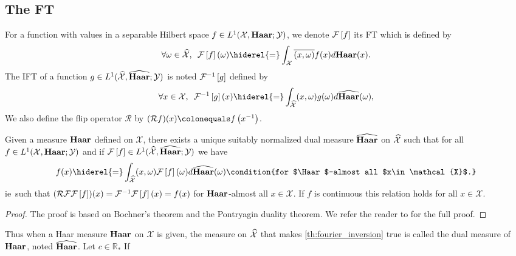\subsection[The Fourier Transform]{The \acl{FT}}
For a function with values in a separable Hilbert space $f\in
L^1(\mathcal{X},\mathbf{Haar};\mathcal{Y})$, we denote $\mathcal{F}\left[f\right]$ its \acf{FT} which is
defined by
\begin{dmath*}
        \forall \omega \in \dual{\mathcal{X}},\enskip \FT{f}(\omega)
        \hiderel{=}\int_{\mathcal{X}} \conj{\pairing{x,\omega}}f(x)d\Haar(x).
\end{dmath*}
The \acf{IFT} of a function $g\in L^1(\widehat{\mathcal{X}},\widehat{\mathbf{Haar}};
\mathcal{Y})$ is noted $\mathcal{F}^{-1}\left[g\right]$ defined by
\begin{dmath*}
    \forall x \in \mathcal{X},\enskip \IFT{g}(x) 
    \hiderel{=}\int_{\dual{\mathcal{X}}} \pairing{x,\omega}g(\omega)
    d\dual{\Haar}(\omega),
\end{dmath*}
We also define the flip operator $\mathcal{R}$ by $(\mathcal{R}f)(x)
\colonequals f\left(\inv{x}\right)$.
\begin{theorem}
    \label{th:fourier_inversion} Given a measure $\Haar$ defined on
    $\mathcal{X}$, there exists a unique suitably normalized dual measure
    $\widehat{\mathbf{Haar}}$ on $\widehat{\mathcal{X}}$ such that for all $f \in
    L^1(\mathcal{X}, \mathbf{Haar};\mathcal{Y})$ and if $\mathcal{F}\left[f\right] \in
    L^1(\widehat{\mathcal{X}}, \widehat{\mathbf{Haar}}; \mathcal{Y})$ we have
    \begin{dmath}
        \label{fourier-l1} f(x) \hiderel{=} \int_{\dual{\mathcal{X}}}
        \pairing{x, \omega} \FT{f}(\omega) d\dual{\Haar}(\omega) \condition{for
        $\Haar$-almost all $x\in \mathcal{X}$.}
    \end{dmath}
    \acs{ie}~such that
    $(\mathcal{R}\mathcal{F}\mathcal{F}\left[f\right])(x)=\mathcal{F}^{-1}\mathcal{F}\left[f\right](x)=f(x)$ for
    $\Haar$-almost all $x\in\mathcal{X}$. If $f$ is continuous this relation
    holds for all $x\in\mathcal{X}$.
\end{theorem}
\begin{proof}
    The proof is based on Bochner's theorem and the Pontryagin duality theorem.
    We refer the reader to \citet[theorem~4.22 page~105 and theorem~4.33
    page~111]{folland1994course} for the full proof.
\end{proof}
Thus when a Haar measure $\Haar$ on $\mathcal{X}$ is given, the measure on
$\widehat{\mathcal{X}}$ that makes \cref{th:fourier_inversion} true is called the
dual measure of $\Haar$, noted $\widehat{\mathbf{Haar}}$. Let $c\in\mathbb{R}_*$ If
